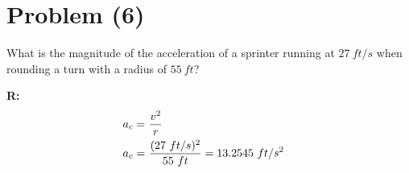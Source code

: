 \section{Problem (6)}
	What is the magnitude of the acceleration of a sprinter running at $27 \ ft/s$ when rounding a turn with a radius of $55 \ ft$?

	\textbf{R:} \newline
	\begin{align}
		a_{c} = \ &\frac{v^{2}}{r}& \notag \\
		a_{c} = \ &\frac{(27 \ ft/s)^{2}}{55 \ ft} = 13.2545 \ ft/s^{2}&
	\end{align}
